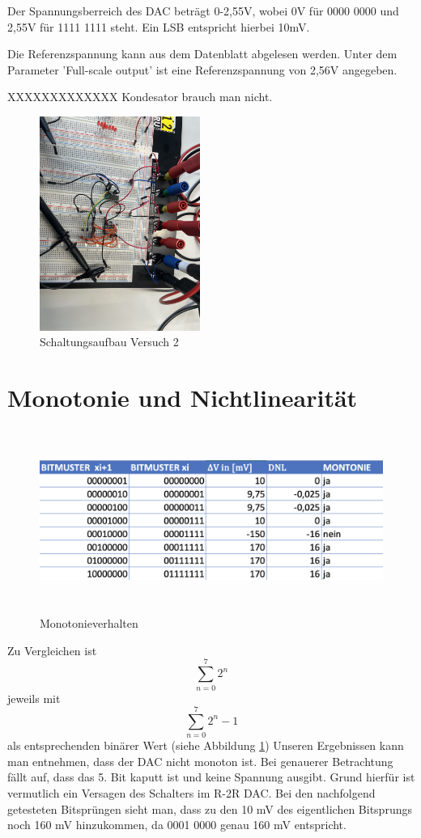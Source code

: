 Der Spannungsberreich des DAC beträgt 0-2,55V, wobei 0V für 0000 0000 
und 2,55V für 1111 1111 steht. Ein LSB entspricht hierbei 10mV.

Die Referenzspannung kann aus dem Datenblatt abgelesen werden. Unter dem 
Parameter 'Full-scale output' ist eine Referenzspannung von 2,56V angegeben.

XXXXXXXXXXXXX Kondesator brauch man nicht.

\begin{figure}[H]
	\centering
	\includegraphics[height=7cm]{images/versuch2-schaltungsaufbau.jpeg} 
	\caption[]{Schaltungsaufbau Versuch 2}
\end{figure}



\section{Monotonie und Nichtlinearität}

\begin{figure}[H]
	\centering
	\includegraphics[height=6cm]{images/versuch2-monotonie-and-nichtlinearitaet.png} 
	\caption[]{Monotonieverhalten}
    \label{fig: Monotonieverhalten}
\end{figure}

Zu Vergleichen ist 
\[
\sum_{n=0}^{7} 2^n
\]
jeweils mit 
\[
\sum_{n=0}^{7} 2^n -1
\] als entsprechenden binärer Wert (siehe Abbildung \ref{fig: Monotonieverhalten})\newline
Unseren Ergebnissen kann man entnehmen, dass der DAC nicht
monoton ist. Bei genauerer Betrachtung fällt auf, dass das 5.
Bit kaputt ist und keine Spannung ausgibt. Grund hierfür ist 
vermutlich ein Versagen des Schalters im R-2R DAC.
Bei den nachfolgend getesteten Bitsprüngen sieht man, dass zu den
10 mV des eigentlichen Bitsprungs noch 160 mV hinzukommen, da 0001 0000
genau 160 mV entspricht.

